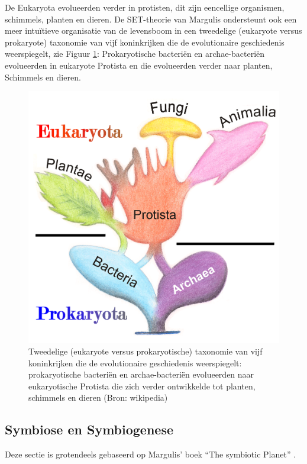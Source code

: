 \documentclass[
  11pt,
]{book}
\begin{document}
De Eukaryota evolueerden verder in protisten, dit zijn eencellige organismen, schimmels, planten en dieren. De SET-theorie van Margulis ondersteunt ook een meer intuïtieve organisatie van de levensboom in een tweedelige (eukaryote versus prokaryote) taxonomie van vijf koninkrijken die de evolutionaire geschiedenis weerspiegelt, zie Figuur \ref{fig:fiveKingdoms}: Prokaryotische bacteriën en archae-bacteriën evolueerden in eukaryote Protista en die evolueerden verder naar planten, Schimmels en dieren.

\begin{figure}

{\centering \includegraphics[width=0.8\linewidth]{./figs/fiveKingdoms} 

}

\caption{Tweedelige (eukaryote versus prokaryotische) taxonomie van vijf koninkrijken die de evolutionaire geschiedenis weerspiegelt: prokaryotische bacteriën en archae-bacteriën evolueerden naar eukaryotische Protista die zich verder ontwikkelde tot planten, schimmels en dieren (Bron: wikipedia)}\label{fig:fiveKingdoms}
\end{figure}

\hypertarget{symbiose-en-symbiogenese}{%
\subsection{Symbiose en Symbiogenese}\label{symbiose-en-symbiogenese}}

Deze sectie is grotendeels gebaseerd op Margulis' boek ``The symbiotic Planet'' \citep{margulis1999}.
\end{document}
